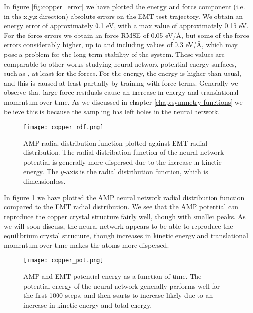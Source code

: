 In figure \ref{fig:copper_error} we have plotted the energy and force component
(i.e. in the x,y,z direction)
absolute errors on the EMT test trajectory. We obtain an energy error
of approximately 0.1 eV, with a max value of approximately 0.16 eV.
For the force errors we obtain an force RMSE of 0.05 eV/Å,
but some of the force errors considerably higher, up to
and including values of 0.3 eV/Å, which may pose
a problem for the long term stability of the system.
These values are comparable to other works studying neural network
potential energy surfaces, such as \cite{stende2017constructing,
treider2017speeding, khorshidi2016amp, PhysRevLett.120.143001},
at least for the forces. For the energy, the energy is higher than usual, and
this is caused at least partially by training with force terms.
Generally we observe that large force residuals cause an increase
in energy and translational momentum over time. As we discussed
in chapter \ref{chap:symmetry-functions} we believe this is because
the sampling has left holes in the neural network.

\begin{figure}[H]
    \centering
    \texttt{[image: copper\_rdf.png]}
    \caption{AMP radial distribution function plotted against
        EMT radial distribution.
        The radial distribution function of the neural network potential is
        generally more dispersed due to the increase in kinetic energy.
        The $y$-axis is the radial distribution function, which is dimensionless.}
    \label{fig:copper-rdf}
\end{figure}

In figure \ref{fig:copper-rdf} we have plotted the AMP neural network
radial distribution function compared to the EMT radial distribution.
We see that the AMP potential can reproduce the copper crystal
structure fairly well, though with smaller peaks.
As we will soon discuss, the neural network appears
to be able to reproduce the equilibrium crystal structure,
though increases in kinetic energy and translational momentum over time
makes the atoms more dispersed.

\begin{figure}[H]
    \centering
    \texttt{[image: copper\_pot.png]}
    \caption{AMP and EMT potential energy as a function of time.
        The potential energy of the neural network generally performs well
        for the first 1000 steps, and then starts to increase
        likely due to an increase in kinetic energy and total energy.}
    \label{fig:copper-pot}
\end{figure}

